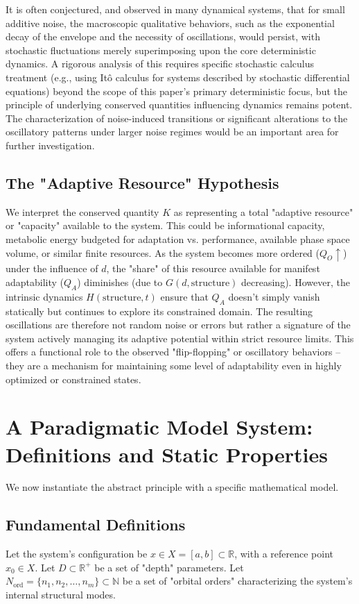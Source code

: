 \documentclass[11pt,a4paper]{article}
\begin{document}
It is often conjectured, and observed in many dynamical systems, that for small additive noise, the macroscopic qualitative behaviors, such as the exponential decay of the envelope and the necessity of oscillations, would persist, with stochastic fluctuations merely superimposing upon the core deterministic dynamics. A rigorous analysis of this requires specific stochastic calculus treatment (e.g., using Itô calculus for systems described by stochastic differential equations) beyond the scope of this paper's primary deterministic focus, but the principle of underlying conserved quantities influencing dynamics remains potent. The characterization of noise-induced transitions or significant alterations to the oscillatory patterns under larger noise regimes would be an important area for further investigation.

\subsection{The "Adaptive Resource" Hypothesis}

We interpret the conserved quantity $K$ as representing a total "adaptive resource" or "capacity" available to the system. This could be informational capacity, metabolic energy budgeted for adaptation vs. performance, available phase space volume, or similar finite resources. As the system becomes more ordered ($Q_O \uparrow$) under the influence of $d$, the "share" of this resource available for manifest adaptability ($Q_A$) diminishes (due to $G(d, \text{structure})$ decreasing). However, the intrinsic dynamics $H(\text{structure}, t)$ ensure that $Q_A$ doesn't simply vanish statically but continues to explore its constrained domain. The resulting oscillations are therefore not random noise or errors but rather a signature of the system actively managing its adaptive potential within strict resource limits. This offers a functional role to the observed "flip-flopping" or oscillatory behaviors – they are a mechanism for maintaining some level of adaptability even in highly optimized or constrained states.

\section{A Paradigmatic Model System: Definitions and Static Properties}

We now instantiate the abstract principle with a specific mathematical model.

\subsection{Fundamental Definitions}
Let the system's configuration be $x \in X = [a,b] \subset \mathbb{R}$, with a reference point $x_0 \in X$.
Let $D \subset \mathbb{R}^+$ be a set of "depth" parameters.
Let $N_{\text{ord}} = \{n_1, n_2, \dots, n_m\} \subset \mathbb{N}$ be a set of "orbital orders" characterizing the system's internal structural modes.
\end{document}
